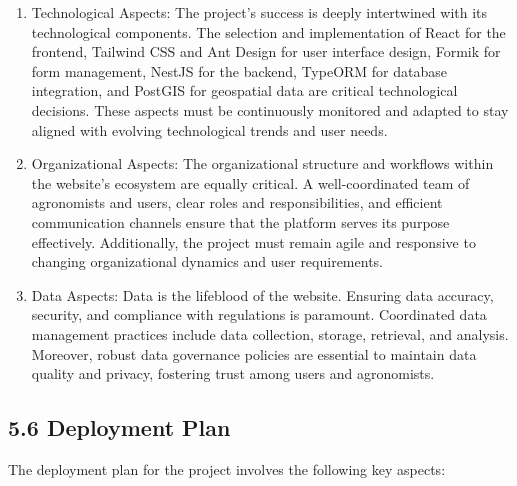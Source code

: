 \begin{enumerate}

    \item Technological Aspects: The project's success is deeply intertwined with its technological components. The selection and implementation of React for the frontend, Tailwind CSS and Ant Design for user interface design, Formik for form management, NestJS for the backend, TypeORM for database integration, and PostGIS for geospatial data are critical technological decisions. These aspects must be continuously monitored and adapted to stay aligned with evolving technological trends and user needs.

    \item Organizational Aspects: The organizational structure and workflows within the website's ecosystem are equally critical. A well-coordinated team of agronomists and users, clear roles and responsibilities, and efficient communication channels ensure that the platform serves its purpose effectively. Additionally, the project must remain agile and responsive to changing organizational dynamics and user requirements.

    \item Data Aspects: Data is the lifeblood of the website. Ensuring data accuracy, security, and compliance with regulations is paramount. Coordinated data management practices include data collection, storage, retrieval, and analysis. Moreover, robust data governance policies are essential to maintain data quality and privacy, fostering trust among users and agronomists.

\end{enumerate}
\subsection{5.6 Deployment Plan}

The deployment plan for the project involves the following key aspects:

